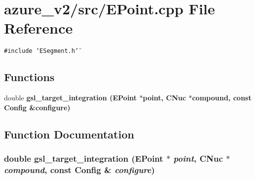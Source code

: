 \section{azure\_\-v2/src/EPoint.cpp File Reference}
\label{EPoint_8cpp}
{\tt \#include \char`\"{}ESegment.h\char`\"{}}\par
\subsection*{Functions}
\begin{CompactItemize}
\item 
double \bf{gsl\_\-target\_\-integration} (\bf{EPoint} $\ast$point, \bf{CNuc} $\ast$compound, const \bf{Config} \&configure)
\end{CompactItemize}


\subsection{Function Documentation}
\subsubsection{\setlength{\rightskip}{0pt plus 5cm}double gsl\_\-target\_\-integration (\bf{EPoint} $\ast$ {\em point}, \bf{CNuc} $\ast$ {\em compound}, const \bf{Config} \& {\em configure})}\label{EPoint_8cpp_ba083078a2ea48a6f06cb18d1f68d6c5}


